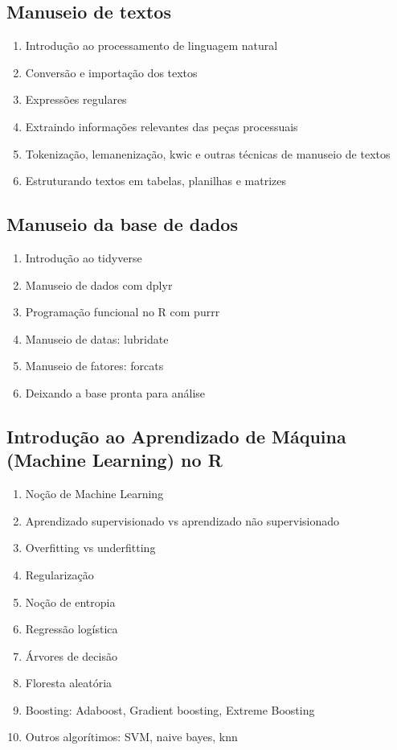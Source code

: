 \documentclass[12pt,]{article}
\providecommand{\tightlist}{%
  \setlength{\itemsep}{0pt}\setlength{\parskip}{0pt}}
\begin{document}
\subsection{Manuseio de textos}\label{manuseio-de-textos}

\begin{enumerate}
\def\labelenumi{\arabic{enumi}.}
\tightlist
\item
  Introdução ao processamento de linguagem natural
\item
  Conversão e importação dos textos
\item
  Expressões regulares
\item
  Extraindo informações relevantes das peças processuais
\item
  Tokenização, lemanenização, kwic e outras técnicas de manuseio de
  textos
\item
  Estruturando textos em tabelas, planilhas e matrizes
\end{enumerate}

\subsection{Manuseio da base de dados}\label{manuseio-da-base-de-dados}

\begin{enumerate}
\def\labelenumi{\arabic{enumi}.}
\tightlist
\item
  Introdução ao tidyverse
\item
  Manuseio de dados com dplyr
\item
  Programação funcional no R com purrr
\item
  Manuseio de datas: lubridate
\item
  Manuseio de fatores: forcats
\item
  Deixando a base pronta para análise
\end{enumerate}

\subsection{Introdução ao Aprendizado de Máquina (Machine Learning) no
R}\label{introducao-ao-aprendizado-de-maquina-machine-learning-no-r}

\begin{enumerate}
\def\labelenumi{\arabic{enumi}.}
\tightlist
\item
  Noção de Machine Learning
\item
  Aprendizado supervisionado vs aprendizado não supervisionado
\item
  Overfitting vs underfitting
\item
  Regularização
\item
  Noção de entropia
\item
  Regressão logística
\item
  Árvores de decisão
\item
  Floresta aleatória
\item
  Boosting: Adaboost, Gradient boosting, Extreme Boosting
\item
  Outros algorítimos: SVM, naive bayes, knn
\end{enumerate}
\end{document}
